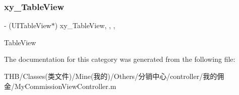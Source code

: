 \subsubsection{\texorpdfstring{xy\+\_\+\+Table\+View}{xy\_TableView}}
{\footnotesize\ttfamily -\/ (U\+I\+Table\+View$\ast$) xy\+\_\+\+Table\+View\hspace{0.3cm}{\ttfamily [read]}, {\ttfamily [write]}, {\ttfamily [nonatomic]}, {\ttfamily [strong]}}

Table\+View 

The documentation for this category was generated from the following file\+:\begin{DoxyCompactItemize}
\item 
T\+H\+B/\+Classes(类文件)/\+Mine(我的)/\+Others/分销中心/controller/我的佣金/My\+Commission\+View\+Controller.\+m\end{DoxyCompactItemize}

